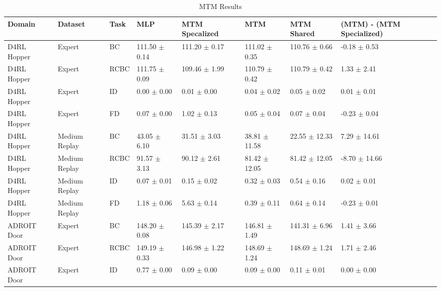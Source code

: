 \begin{table*}
  \caption{MTM Results}
  \label{tab:mtm}
  \centering
  \begin{tabular}{l l l l l l l l}
    \toprule
     Domain &       Dataset & Task &               MLP &    MTM Specalized &               MTM &        MTM Shared &                         (MTM) - (MTM Specialized) \\
    \midrule
D4RL Hopper &        Expert &   BC & 111.50 $\pm$ 0.14 & 111.20 $\pm$ 0.17 & 111.02 $\pm$ 0.35 & 110.76 $\pm$ 0.66 &  \cellcolor[rgb]{0.01,0.00,0.00} -0.18 $\pm$ 0.53 \\
D4RL Hopper &        Expert & RCBC & 111.75 $\pm$ 0.09 & 109.46 $\pm$ 1.99 & 110.79 $\pm$ 0.42 & 110.79 $\pm$ 0.42 &   \cellcolor[rgb]{0.00,0.07,0.00} 1.33 $\pm$ 2.41 \\
D4RL Hopper &        Expert &   ID &   0.00 $\pm$ 0.00 &   0.01 $\pm$ 0.00 &   0.04 $\pm$ 0.02 &   0.05 $\pm$ 0.02 &   \cellcolor[rgb]{0.00,0.01,0.00} 0.01 $\pm$ 0.01 \\
D4RL Hopper &        Expert &   FD &   0.07 $\pm$ 0.00 &   1.02 $\pm$ 0.13 &   0.05 $\pm$ 0.04 &   0.07 $\pm$ 0.04 &  \cellcolor[rgb]{0.02,0.00,0.00} -0.23 $\pm$ 0.04 \\
    \midrule
D4RL Hopper & Medium Replay &   BC &  43.05 $\pm$ 6.10 &  31.51 $\pm$ 3.03 & 38.81 $\pm$ 11.58 & 22.55 $\pm$ 12.33 &  \cellcolor[rgb]{0.00,0.37,0.00} 7.29 $\pm$ 14.61 \\
D4RL Hopper & Medium Replay & RCBC &  91.57 $\pm$ 3.13 &  90.12 $\pm$ 2.61 & 81.42 $\pm$ 12.05 & 81.42 $\pm$ 12.05 & \cellcolor[rgb]{0.44,0.00,0.00} -8.70 $\pm$ 14.66 \\
D4RL Hopper & Medium Replay &   ID &   0.07 $\pm$ 0.01 &   0.15 $\pm$ 0.02 &   0.32 $\pm$ 0.03 &   0.54 $\pm$ 0.16 &   \cellcolor[rgb]{0.00,0.01,0.00} 0.02 $\pm$ 0.01 \\
D4RL Hopper & Medium Replay &   FD &   1.18 $\pm$ 0.06 &   5.63 $\pm$ 0.14 &   0.39 $\pm$ 0.11 &   0.64 $\pm$ 0.14 &  \cellcolor[rgb]{0.02,0.00,0.00} -0.23 $\pm$ 0.01 \\
    \midrule
ADROIT Door &        Expert &   BC & 148.20 $\pm$ 0.08 & 145.39 $\pm$ 2.17 & 146.81 $\pm$ 1.49 & 141.31 $\pm$ 6.96 &   \cellcolor[rgb]{0.00,0.07,0.00} 1.41 $\pm$ 3.66 \\
ADROIT Door &        Expert & RCBC & 149.19 $\pm$ 0.33 & 146.98 $\pm$ 1.22 & 148.69 $\pm$ 1.24 & 148.69 $\pm$ 1.24 &   \cellcolor[rgb]{0.00,0.09,0.00} 1.71 $\pm$ 2.46 \\
ADROIT Door &        Expert &   ID &   0.77 $\pm$ 0.00 &   0.09 $\pm$ 0.00 &   0.09 $\pm$ 0.00 &   0.11 $\pm$ 0.01 &   \cellcolor[rgb]{0.00,0.01,0.00} 0.00 $\pm$ 0.00 \\

\end{tabular}
\end{table*}
